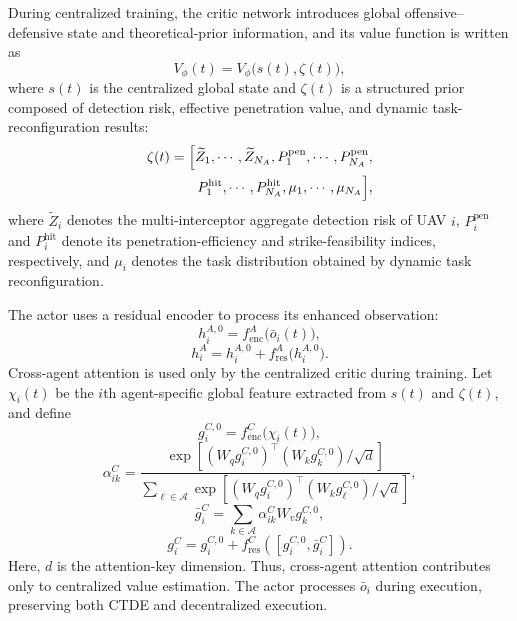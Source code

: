 \documentclass{cja}
\begin{document}
During centralized training, the critic network introduces global offensive--defensive state and theoretical-prior information, and its value function is written as
\begin{equation}
V_{\phi}(t)
=
V_{\phi}\bigl(s(t),\zeta(t)\bigr),
\end{equation}
where $s(t)$ is the centralized global state and $\zeta(t)$ is a structured prior composed of detection risk, effective penetration value, and dynamic task-reconfiguration results:
\begin{equation}
\begin{aligned}
\zeta(t)
=
\Bigl[
\widetilde Z_1,\cdots,\widetilde Z_{N_A},
P_1^{\mathrm{pen}},\cdots,P_{N_A}^{\mathrm{pen}},\\
P_1^{\mathrm{hit}},\cdots,P_{N_A}^{\mathrm{hit}},
\mu_1,\cdots,\mu_{N_A}
\Bigr],
\end{aligned}
\end{equation}
where $\widetilde Z_i$ denotes the multi-interceptor aggregate detection risk of UAV $i$, $P_i^{\mathrm{pen}}$ and $P_i^{\mathrm{hit}}$ denote its penetration-efficiency and strike-feasibility indices, respectively, and $\mu_i$ denotes the task distribution obtained by dynamic task reconfiguration.

The actor uses a residual encoder to process its enhanced observation:
\begin{equation}
h_i^{A,0}=f_{\mathrm{enc}}^{A}\bigl(\bar o_i(t)\bigr),
\end{equation}
\begin{equation}
h_i^{A}
=
h_i^{A,0}+f_{\mathrm{res}}^{A}\bigl(h_i^{A,0}\bigr).
\end{equation}
Cross-agent attention is used only by the centralized critic during training. Let $\chi_i(t)$ be the $i$th agent-specific global feature extracted from $s(t)$ and $\zeta(t)$, and define
\begin{equation}
g_i^{C,0}=f_{\mathrm{enc}}^{C}\bigl(\chi_i(t)\bigr),
\end{equation}
\begin{equation}
\alpha_{ik}^{C}
=
\frac{
\exp\left[(W_qg_i^{C,0})^{\top}(W_kg_k^{C,0})/\sqrt d\right]
}{
\sum_{\ell\in\mathcal A}
\exp\left[(W_qg_i^{C,0})^{\top}(W_kg_\ell^{C,0})/\sqrt d\right]
},
\end{equation}
\begin{equation}
\bar g_i^{C}
=
\sum_{k\in\mathcal A}\alpha_{ik}^{C}W_vg_k^{C,0},
\end{equation}
\begin{equation}
g_i^{C}
=
g_i^{C,0}
+f_{\mathrm{res}}^{C}\!\left([g_i^{C,0},\bar g_i^{C}]\right).
\end{equation}
Here, $d$ is the attention-key dimension. Thus, cross-agent attention contributes only to centralized value estimation. The actor processes $\bar o_i$ during execution, preserving both CTDE and decentralized execution.
\end{document}
